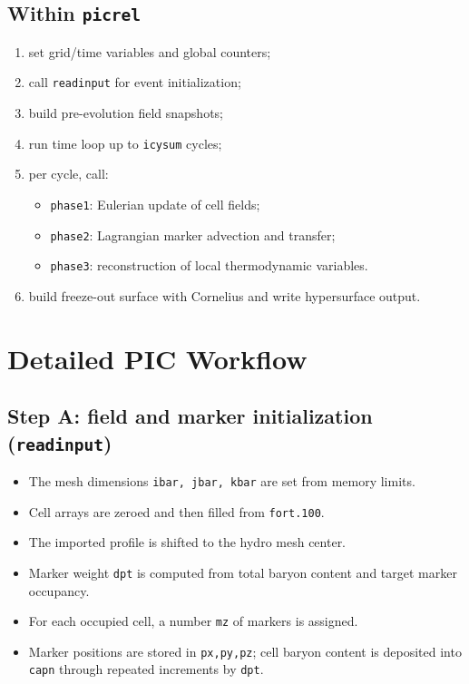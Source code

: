 \documentclass[11pt,a4paper]{article}
\begin{document}
\subsection{Within \texttt{picrel}}
\begin{enumerate}
\item set grid/time variables and global counters;
\item call \texttt{readinput} for event initialization;
\item build pre-evolution field snapshots;
\item run time loop up to \texttt{icysum} cycles;
\item per cycle, call:
  \begin{itemize}
  \item \texttt{phase1}: Eulerian update of cell fields;
  \item \texttt{phase2}: Lagrangian marker advection and transfer;
  \item \texttt{phase3}: reconstruction of local thermodynamic variables.
  \end{itemize}
\item build freeze-out surface with Cornelius and write hypersurface output.
\end{enumerate}

\section{Detailed PIC Workflow}
\subsection{Step A: field and marker initialization (\texttt{readinput})}
\begin{itemize}
\item The mesh dimensions \texttt{ibar, jbar, kbar} are set from memory limits.
\item Cell arrays are zeroed and then filled from \texttt{fort.100}.
\item The imported profile is shifted to the hydro mesh center.
\item Marker weight \texttt{dpt} is computed from total baryon content and
      target marker occupancy.
\item For each occupied cell, a number \texttt{mz} of markers is assigned.
\item Marker positions are stored in \texttt{px,py,pz}; cell baryon content
      is deposited into \texttt{capn} through repeated increments by \texttt{dpt}.
\end{itemize}
\end{document}
